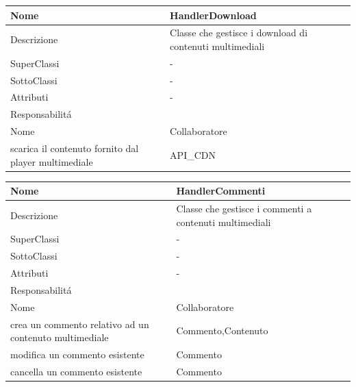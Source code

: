 \begin{center}
    \begin{tabular}{ |p{3cm}|p{3cm}|p{3cm}|p{3cm}| }
        \hline
        Nome & \multicolumn{3}{|p{9cm}|}{HandlerDownload} \\\hline
        Descrizione & \multicolumn{3}{|p{9cm}|}{Classe che gestisce i download di contenuti multimediali} \\\hline
        SuperClassi & \multicolumn{3}{|p{9cm}|}{-} \\\hline
        SottoClassi & \multicolumn{3}{|p{9cm}|}{-} \\\hline
        Attributi & \multicolumn{3}{|p{9cm}|}{-} \\\hline
        \multicolumn{4}{|p{12cm}|}{Responsabilit\'a} \\\hline
        \multicolumn{2}{|p{6cm}|}{Nome} & \multicolumn{2}{|p{6cm}|}{Collaboratore} \\\hline
        \multicolumn{2}{|p{6cm}|}{scarica il contenuto fornito dal player multimediale} & \multicolumn{2}{|p{6cm}|}{API\_CDN} \\\hline
    \end{tabular}
\end{center}

\begin{center}
    \begin{tabular}{ |p{3cm}|p{3cm}|p{3cm}|p{3cm}| }
        \hline
        Nome & \multicolumn{3}{|p{9cm}|}{HandlerCommenti} \\\hline
        Descrizione & \multicolumn{3}{|p{9cm}|}{Classe che gestisce i commenti a contenuti multimediali} \\\hline
        SuperClassi & \multicolumn{3}{|p{9cm}|}{-} \\\hline
        SottoClassi & \multicolumn{3}{|p{9cm}|}{-} \\\hline
        Attributi & \multicolumn{3}{|p{9cm}|}{-} \\\hline
        \multicolumn{4}{|p{12cm}|}{Responsabilit\'a} \\\hline
        \multicolumn{2}{|p{6cm}|}{Nome} & \multicolumn{2}{|p{6cm}|}{Collaboratore} \\\hline
        \multicolumn{2}{|p{6cm}|}{crea un commento relativo ad un contenuto multimediale} & \multicolumn{2}{|p{6cm}|}{Commento,Contenuto} \\\hline
        \multicolumn{2}{|p{6cm}|}{modifica un commento esistente} & \multicolumn{2}{|p{6cm}|}{Commento} \\\hline
        \multicolumn{2}{|p{6cm}|}{cancella un commento esistente} & \multicolumn{2}{|p{6cm}|}{Commento} \\\hline
    \end{tabular}
\end{center}

